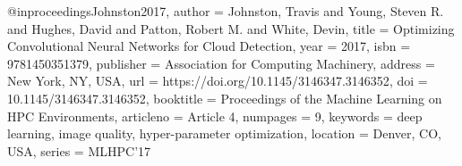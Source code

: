@inproceedings{Johnston2017,
  author = {Johnston, Travis and Young, Steven R. and Hughes, David and Patton, Robert M. and White, Devin},
  title = {Optimizing Convolutional Neural Networks for Cloud Detection},
  year = {2017},
  isbn = {9781450351379},
  publisher = {Association for Computing Machinery},
  address = {New York, NY, USA},
  url = {https://doi.org/10.1145/3146347.3146352},
  doi = {10.1145/3146347.3146352},
  booktitle = {Proceedings of the Machine Learning on HPC Environments},
  articleno = {Article 4},
  numpages = {9},
  keywords = {deep learning, image quality, hyper-parameter optimization},
  location = {Denver, CO, USA},
  series = {MLHPC’17}
}
